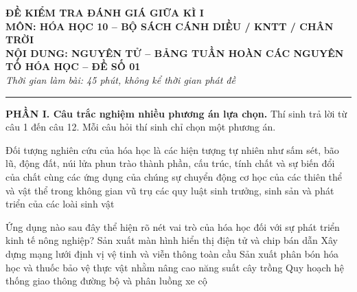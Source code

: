 \begin{center}
    \textbf{\LARGE ĐỀ KIỂM TRA ĐÁNH GIÁ GIỮA KÌ I}\\
    \textbf{\Large MÔN: HÓA HỌC 10 -- BỘ SÁCH CÁNH DIỀU / KNTT / CHÂN TRỜI}\\
    \textbf{\large NỘI DUNG: NGUYÊN TỬ -- BẢNG TUẦN HOÀN CÁC NGUYÊN TỐ HÓA HỌC -- ĐỀ SỐ 01}\\
    \textit{Thời gian làm bài: 45 phút, không kể thời gian phát đề}
\end{center}
\hrule
\vspace{0.5cm}

\noindent\textbf{\large PHẦN I. Câu trắc nghiệm nhiều phương án lựa chọn.} Thí sinh trả lời từ câu 1 đến câu 12. Mỗi câu hỏi thí sinh chỉ chọn một phương án.

\begin{ex}
    Đối tượng nghiên cứu của hóa học là
    \choice
    {các hiện tượng tự nhiên như sấm sét, bão lũ, động đất, núi lửa phun trào}
    {\True thành phần, cấu trúc, tính chất và sự biến đổi của chất cùng các ứng dụng của chúng}
    {sự chuyển động cơ học của các thiên thể và vật thể trong không gian vũ trụ}
    {các quy luật sinh trưởng, sinh sản và phát triển của các loài sinh vật}
\end{ex}

\begin{ex}
    Ứng dụng nào sau đây thể hiện rõ nét vai trò của hóa học đối với sự phát triển kinh tế nông nghiệp?
    \choice
    {Sản xuất màn hình hiển thị điện tử và chip bán dẫn}
    {Xây dựng mạng lưới định vị vệ tinh và viễn thông toàn cầu}
    {\True Sản xuất phân bón hóa học và thuốc bảo vệ thực vật nhằm nâng cao năng suất cây trồng}
    {Quy hoạch hệ thống giao thông đường bộ và phân luồng xe cộ}
\end{ex}

